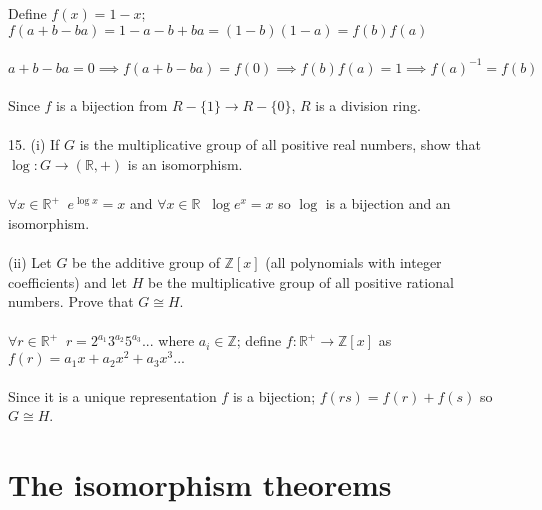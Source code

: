 \documentclass{article}
\begin{document}
\begin{siderules}
\null\qquad Define \(f(x)=1-x\); \(f(a+b-ba)=1-a-b+ba=(1-b)(1-a)=f(b)f(a)\)\\\\
\null\qquad \(a+b-ba=0\implies f(a+b-ba)=f(0)\implies f(b)f(a)=1\implies f(a)^{-1}=f(b)\)\\\\
\null\qquad Since \(f\) is a bijection from \(R-\{1\}\to R-\{0\}\), \(R\) is a division ring.\\\\
\color{blue} 15. (i) If \(G\) is the multiplicative group of all positive real numbers, 
show that \(\log: G\to (\mathbb{R}, +)\) is an isomorphism.\\\\\color{black}
\null\qquad \(\forall x\in \mathbb{R}^{+}\;\;e^{\log x}=x\) and \(\forall x\in \mathbb{R}\;\;\log e^{x}=x\) so \(\log\) is a bijection and an isomorphism.\\\\
\color{blue} (ii) Let \(G\) be the additive group of \(\mathbb{Z}[x]\) (all polynomials with 
integer coefficients) and let \(H\) be the multiplicative group of all positive rational numbers. 
Prove that \(G\cong H\).\\\\\color{black}
\null\qquad \(\forall r\in \mathbb{R}^{+}\;\; r=2^{a_{1}}3^{a_{2}}5^{a_{3}}...\) where \(a_{i}\in\mathbb{Z}\); define \(f: \mathbb{R}^{+}\to\mathbb{Z}[x]\) as \(f(r)=a_{1}x+a_{2}x^{2}+a_{3}x^{3}...\)\\\\
\null\qquad Since it is a unique representation \(f\) is a bijection; \(f(rs)=f(r)+f(s)\) so \(G\cong H\).
\end{siderules}
\newpage
\section{The isomorphism theorems}
\null
\end{document}
